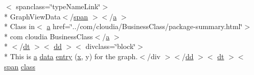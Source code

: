 \begin{DoxyCompactItemize}
$<$ spanclass=\char`\"{}type\-Name\-Link\char`\"{}$>$\\*
 Graph\-View\-Data$<$/\hyperlink{stylesheet_8css_a8343996ebcf16220b04e54659aac31cc}{span} $>$$<$/\hyperlink{style_8css_a5e8981582017bb8b84c21f148345d1f7}{a} $>$\\*
 Class in$<$ \hyperlink{style_8css_a5e8981582017bb8b84c21f148345d1f7}{a} href=\char`\"{}../com/cloudia/Business\-Class/package-\/summary.\-html\char`\"{}$>$\\*
 com cloudia Business\-Class$<$/\hyperlink{style_8css_a5e8981582017bb8b84c21f148345d1f7}{a} $>$\\*
$<$/\hyperlink{stylesheet_8css_a107565fb4039d33b041380d6e0ea1d80}{dt} $>$$<$ \hyperlink{stylesheet_8css_a47f4718a86835a7771ec592ece845221}{dd} $>$$<$ divclass=\char`\"{}block\char`\"{}$>$\\*
 This is \hyperlink{style_8css_a5e8981582017bb8b84c21f148345d1f7}{a} \hyperlink{_show_all_list_adapter_8html_a511ae0b1c13f95e5f08f1a0dd3da3d93}{data} \hyperlink{index-7_8html_ad98caf03ef50007e5c86c78d40c56db1}{entry} (\hyperlink{_graph_view_data_8html_a9336ebf25087d91c818ee6e9ec29f8c1}{x}, y) for the graph.$<$/div $>$$<$/\hyperlink{stylesheet_8css_a47f4718a86835a7771ec592ece845221}{dd} $>$$<$ \hyperlink{stylesheet_8css_a107565fb4039d33b041380d6e0ea1d80}{dt} $>$$<$ \hyperlink{stylesheet_8css_a8343996ebcf16220b04e54659aac31cc}{span} \hyperlink{_tools_8html_acf06f836132665ba8114f5a414c2403f}{class}
\end{DoxyCompactItemize}
